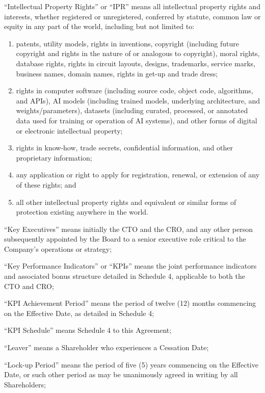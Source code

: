 ``Intellectual Property Rights'' or ``IPR'' means all intellectual property rights and interests, whether registered or unregistered, conferred by statute, common law or equity in any part of the world, including but not limited to:
\begin{enumerate}[label=(\roman*)]
\item patents, utility models, rights in inventions, copyright (including future copyright and rights in the nature of or analogous to copyright), moral rights, database rights, rights in circuit layouts, designs, trademarks, service marks, business names, domain names, rights in get-up and trade dress;
\item rights in computer software (including source code, object code, algorithms, and APIs), AI models (including trained models, underlying architecture, and weights/parameters), datasets (including curated, processed, or annotated data used for training or operation of AI systems), and other forms of digital or electronic intellectual property;
\item rights in know-how, trade secrets, confidential information, and other proprietary information;
\item any application or right to apply for registration, renewal, or extension of any of these rights; and
\item all other intellectual property rights and equivalent or similar forms of protection existing anywhere in the world.
\end{enumerate}

``Key Executives'' means initially the CTO and the CRO, and any other person subsequently appointed by the Board to a senior executive role critical to the Company's operations or strategy;

``Key Performance Indicators'' or ``KPIs'' means the joint performance indicators and associated bonus structure detailed in Schedule 4, applicable to both the CTO and CRO;

``KPI Achievement Period'' means the period of twelve (12) months commencing on the Effective Date, as detailed in Schedule 4;

``KPI Schedule'' means Schedule 4 to this Agreement;

``Leaver'' means a Shareholder who experiences a Cessation Date;

``Lock-up Period'' means the period of five (5) years commencing on the Effective Date, or such other period as may be unanimously agreed in writing by all Shareholders;

